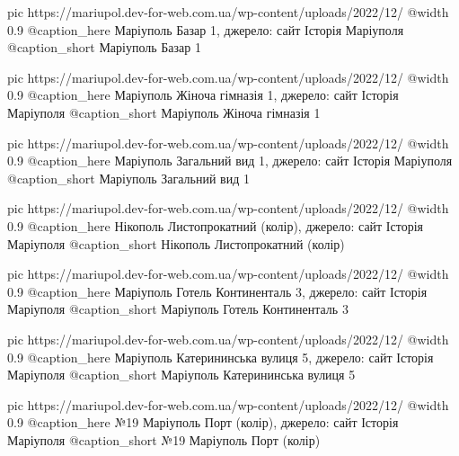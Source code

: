 	pic https://mariupol.dev-for-web.com.ua/wp-content/uploads/2022/12/%
	@width 0.9
	@caption_here Маріуполь Базар 1, джерело: сайт Історія Маріуполя
	@caption_short Маріуполь Базар 1

	pic https://mariupol.dev-for-web.com.ua/wp-content/uploads/2022/12/%
	@width 0.9
	@caption_here Маріуполь Жіноча гімназія 1, джерело: сайт Історія Маріуполя
	@caption_short Маріуполь Жіноча гімназія 1

	pic https://mariupol.dev-for-web.com.ua/wp-content/uploads/2022/12/%
	@width 0.9
	@caption_here Маріуполь Загальний вид 1, джерело: сайт Історія Маріуполя
	@caption_short Маріуполь Загальний вид 1

	pic https://mariupol.dev-for-web.com.ua/wp-content/uploads/2022/12/%
	@width 0.9
	@caption_here Нікополь Листопрокатний (колір), джерело: сайт Історія Маріуполя
	@caption_short Нікополь Листопрокатний (колір)

	pic https://mariupol.dev-for-web.com.ua/wp-content/uploads/2022/12/%
	@width 0.9
	@caption_here Маріуполь Готель Континенталь 3, джерело: сайт Історія Маріуполя
	@caption_short Маріуполь Готель Континенталь 3

	pic https://mariupol.dev-for-web.com.ua/wp-content/uploads/2022/12/%
	@width 0.9
	@caption_here Маріуполь Катерининська вулиця 5, джерело: сайт Історія Маріуполя
	@caption_short Маріуполь Катерининська вулиця 5

	pic https://mariupol.dev-for-web.com.ua/wp-content/uploads/2022/12/%
	@width 0.9
	@caption_here №19 Маріуполь Порт (колір), джерело: сайт Історія Маріуполя
	@caption_short №19 Маріуполь Порт (колір)

